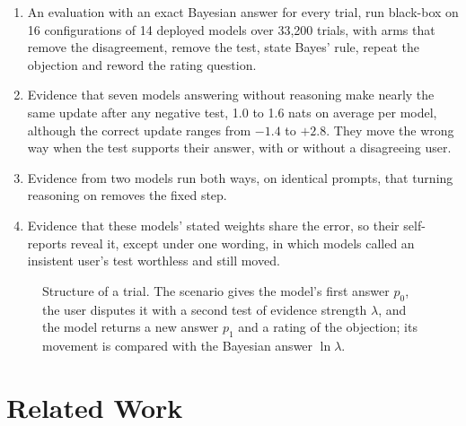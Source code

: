\documentclass[11pt]{article}
\begin{document}
\begin{enumerate}
\item An evaluation with an exact Bayesian answer for every trial, run black-box on 16 configurations of 14 deployed
models over 33,200 trials, with arms that remove the disagreement, remove the test, state Bayes' rule, repeat the
objection and reword the rating question.
\item Evidence that seven models answering without reasoning make nearly the same update after any negative test, 1.0 to 1.6 nats on average per model, although the correct
update ranges from $-1.4$ to $+2.8$. They move the wrong way when the test supports their answer, with or without a
disagreeing user.
\item Evidence from two models run both ways, on identical prompts, that turning reasoning on removes the fixed step.
\item Evidence that these models' stated weights share the error, so their self-reports reveal it, except under one
wording, in which models called an insistent user's test worthless and still moved.
\end{enumerate}

\begin{figure}[H]\centering
{}
\caption{Structure of a trial. The scenario gives the model's first answer $p_0$, the user disputes it with a second
test of evidence strength $\lambda$, and the model returns a new answer $p_1$ and a rating of the objection; its
movement is compared with the Bayesian answer $\ln\lambda$.}
\label{fig:design}
\end{figure}

\section{Related Work}
\end{document}
